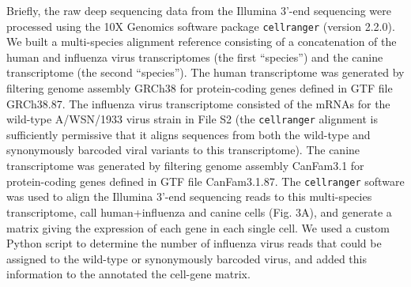 \documentclass[]{article}
\begin{document}
Briefly, the raw deep sequencing data from the Illumina 3'-end sequencing were processed using the 10X Genomics software package \texttt{cellranger} (version 2.2.0). 
We built a multi-species alignment reference consisting of a concatenation of the human and influenza virus transcriptomes (the first ``species'') and the canine transcriptome (the second ``species''). 
The human transcriptome was generated by filtering genome assembly GRCh38 for protein-coding genes defined in GTF file GRCh38.87.
The influenza virus transcriptome consisted of the mRNAs for the wild-type A/WSN/1933 virus strain in File S2 (the \texttt{cellranger} alignment is sufficiently permissive that it aligns sequences from both the wild-type and synonymously barcoded viral variants to this transcriptome).
The canine transcriptome was generated by filtering genome assembly CanFam3.1 for protein-coding genes defined in GTF file CanFam3.1.87.
The \texttt{cellranger} software was used to align the Illumina 3'-end sequencing reads to this multi-species transcriptome, call human+influenza and canine cells (Fig. 3A), and generate a matrix giving the expression of each gene in each single cell.
We used a custom Python script to determine the number of influenza virus reads that could be assigned to the wild-type or synonymously barcoded virus, and added this information to the annotated the cell-gene matrix.
\end{document}
